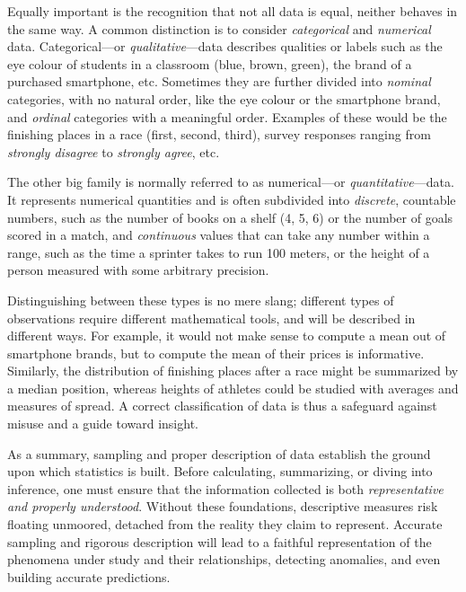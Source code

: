 \medskip

Equally important is the recognition that not all data is equal, neither behaves in the same way. A common distinction is to consider \textit{categorical} and \textit{numerical} data. Categorical—or \textit{qualitative}—data describes qualities or labels such as the eye colour of students in a classroom (blue, brown, green), the brand of a purchased smartphone, etc. Sometimes they are further divided into \textit{nominal} categories, with no natural order, like the eye colour or the smartphone brand, and \textit{ordinal} categories with a meaningful order. Examples of these would be the finishing places in a race (first, second, third), survey responses ranging from \textit{strongly disagree} to \textit{strongly agree}, etc.

\medskip

The other big family is normally referred to as numerical—or \textit{quantitative}—data. It represents numerical quantities and is often subdivided into \textit{discrete}, countable numbers, such as the number of books on a shelf (4, 5, 6) or the number of goals scored in a match, and \textit{continuous} values that can take any number within a range, such as the time a sprinter takes to run 100 meters, or the height of a person measured with some arbitrary precision.

\medskip

Distinguishing between these types is no mere slang; different types of observations require different mathematical tools, and will be described in different ways. For example, it would not make sense to compute a mean out of smartphone brands, but to compute the mean of their prices is informative. Similarly, the distribution of finishing places after a race might be summarized by a median position, whereas heights of athletes could be studied with averages and measures of spread. A correct classification of data is thus a safeguard against misuse and a guide toward insight.

\medskip

As a summary, sampling and proper description of data establish the ground upon which statistics is built. Before calculating, summarizing, or diving into inference, one must ensure that the information collected is both \textit{representative and properly understood}. Without these foundations, descriptive measures risk floating unmoored, detached from the reality they claim to represent. Accurate sampling and rigorous description will lead to a faithful representation of the phenomena under study and their relationships, detecting anomalies, and even building accurate predictions.

